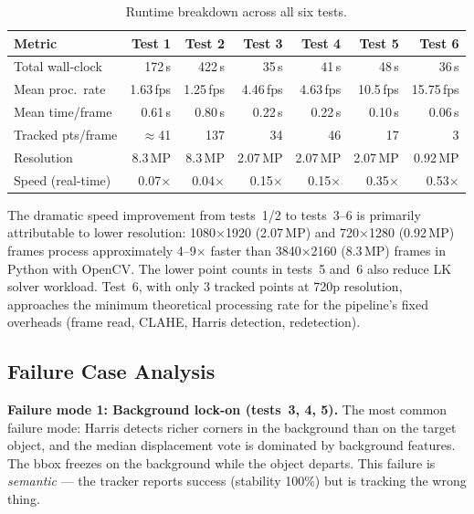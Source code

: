 \documentclass[12pt,a4paper]{article}
\begin{document}
\begin{table}[H]
\centering\small
\caption{Runtime breakdown across all six tests.}
\label{tab:runtime}
\renewcommand{\arraystretch}{1.15}
\begin{tabularx}{\textwidth}{lRRRRRR}
\toprule
{}
\textbf{Metric} & \textbf{Test 1} & \textbf{Test 2} & \textbf{Test 3} & \textbf{Test 4} & \textbf{Test 5} & \textbf{Test 6} \\
\midrule
Total wall-clock & 172\,s & 422\,s & 35\,s & 41\,s & 48\,s & 36\,s \\
Mean proc.\ rate & 1.63\,fps & 1.25\,fps & 4.46\,fps & 4.63\,fps & 10.5\,fps & 15.75\,fps \\
Mean time/frame & 0.61\,s & 0.80\,s & 0.22\,s & 0.22\,s & 0.10\,s & 0.06\,s \\
Tracked pts/frame & $\approx$41 & 137 & 34 & 46 & 17 & 3 \\
Resolution & 8.3\,MP & 8.3\,MP & 2.07\,MP & 2.07\,MP & 2.07\,MP & 0.92\,MP \\
Speed (real-time) & 0.07$\times$ & 0.04$\times$ & 0.15$\times$ & 0.15$\times$ & 0.35$\times$ & 0.53$\times$ \\
\bottomrule
\end{tabularx}
\end{table}

The dramatic speed improvement from tests~1/2 to tests~3--6 is primarily attributable to
lower resolution: 1080$\times$1920 (2.07\,MP) and 720$\times$1280 (0.92\,MP) frames process
approximately 4--9$\times$ faster than 3840$\times$2160 (8.3\,MP) frames in Python with
OpenCV. The lower point counts in tests~5 and~6 also reduce LK solver workload. Test~6, with
only 3 tracked points at 720p resolution, approaches the minimum theoretical processing rate
for the pipeline's fixed overheads (frame read, CLAHE, Harris detection, redetection).

\subsection{Failure Case Analysis}

\textbf{Failure mode 1: Background lock-on (tests~3, 4, 5).}
The most common failure mode: Harris detects richer corners in the background than on the
target object, and the median displacement vote is dominated by background features. The bbox
freezes on the background while the object departs. This failure is \emph{semantic} --- the
tracker reports success (stability 100\%) but is tracking the wrong thing.
\end{document}
